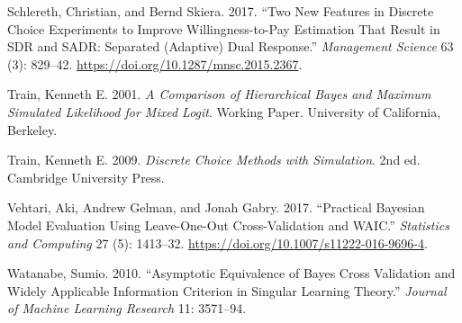\documentclass[
  letterpaper,
  DIV=11,
  numbers=noendperiod]{scrartcl}
\newlength{\cslhangindent}
\newenvironment{CSLReferences}[2] %
 {\begin{list}{}{%
  \setlength{\itemindent}{0pt}
  \setlength{\leftmargin}{0pt}
  \setlength{\parsep}{0pt}
  \ifodd #1
   \setlength{\leftmargin}{\cslhangindent}
   \setlength{\itemindent}{-1\cslhangindent}
  \fi
  \setlength{\itemsep}{#2\baselineskip}}}
 {\end{list}}
\theoremstyle{plain}
\theoremstyle{plain}
\theoremstyle{remark}
\begin{document}
\begin{CSLReferences}{1}{1}
Schlereth, Christian, and Bernd Skiera. 2017. {``Two New Features in
Discrete Choice Experiments to Improve Willingness-to-Pay Estimation
That Result in {SDR} and {SADR}: Separated (Adaptive) Dual Response.''}
\emph{Management Science} 63 (3): 829--42.
\url{https://doi.org/10.1287/mnsc.2015.2367}.

Train, Kenneth E. 2001. \emph{A Comparison of Hierarchical {Bayes} and
Maximum Simulated Likelihood for Mixed Logit}. Working Paper. University
of California, Berkeley.

Train, Kenneth E. 2009. \emph{Discrete Choice Methods with Simulation}.
2nd ed. Cambridge University Press.

Vehtari, Aki, Andrew Gelman, and Jonah Gabry. 2017. {``Practical
{Bayesian} Model Evaluation Using Leave-One-Out Cross-Validation and
{WAIC}.''} \emph{Statistics and Computing} 27 (5): 1413--32.
\url{https://doi.org/10.1007/s11222-016-9696-4}.

Watanabe, Sumio. 2010. {``Asymptotic Equivalence of {Bayes} Cross
Validation and Widely Applicable Information Criterion in Singular
Learning Theory.''} \emph{Journal of Machine Learning Research} 11:
3571--94.

\end{CSLReferences}
\end{document}
